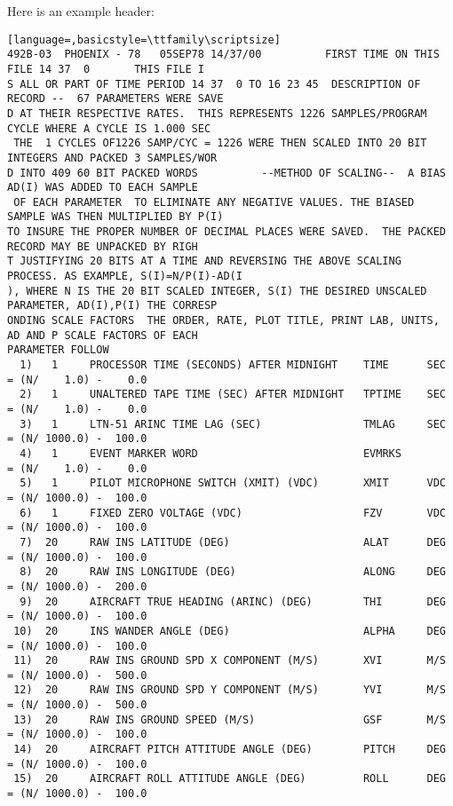 \documentclass{report}
\begin{document}
\noindent Here is an example header:
\begin{lstlisting}[language=,basicstyle=\ttfamily\scriptsize]
492B-03  PHOENIX - 78   05SEP78 14/37/00          FIRST TIME ON THIS FILE 14 37  0       THIS FILE I
S ALL OR PART OF TIME PERIOD 14 37  0 TO 16 23 45  DESCRIPTION OF RECORD --  67 PARAMETERS WERE SAVE
D AT THEIR RESPECTIVE RATES.  THIS REPRESENTS 1226 SAMPLES/PROGRAM CYCLE WHERE A CYCLE IS 1.000 SEC
 THE  1 CYCLES OF1226 SAMP/CYC = 1226 WERE THEN SCALED INTO 20 BIT INTEGERS AND PACKED 3 SAMPLES/WOR
D INTO 409 60 BIT PACKED WORDS          --METHOD OF SCALING--  A BIAS AD(I) WAS ADDED TO EACH SAMPLE
 OF EACH PARAMETER  TO ELIMINATE ANY NEGATIVE VALUES. THE BIASED SAMPLE WAS THEN MULTIPLIED BY P(I)
TO INSURE THE PROPER NUMBER OF DECIMAL PLACES WERE SAVED.  THE PACKED RECORD MAY BE UNPACKED BY RIGH
T JUSTIFYING 20 BITS AT A TIME AND REVERSING THE ABOVE SCALING PROCESS. AS EXAMPLE, S(I)=N/P(I)-AD(I
), WHERE N IS THE 20 BIT SCALED INTEGER, S(I) THE DESIRED UNSCALED PARAMETER, AD(I),P(I) THE CORRESP
ONDING SCALE FACTORS  THE ORDER, RATE, PLOT TITLE, PRINT LAB, UNITS, AD AND P SCALE FACTORS OF EACH
PARAMETER FOLLOW
  1)   1     PROCESSOR TIME (SECONDS) AFTER MIDNIGHT    TIME      SEC     = (N/    1.0) -    0.0
  2)   1     UNALTERED TAPE TIME (SEC) AFTER MIDNIGHT   TPTIME    SEC     = (N/    1.0) -    0.0
  3)   1     LTN-51 ARINC TIME LAG (SEC)                TMLAG     SEC     = (N/ 1000.0) -  100.0
  4)   1     EVENT MARKER WORD                          EVMRKS            = (N/    1.0) -    0.0
  5)   1     PILOT MICROPHONE SWITCH (XMIT) (VDC)       XMIT      VDC     = (N/ 1000.0) -  100.0
  6)   1     FIXED ZERO VOLTAGE (VDC)                   FZV       VDC     = (N/ 1000.0) -  100.0
  7)  20     RAW INS LATITUDE (DEG)                     ALAT      DEG     = (N/ 1000.0) -  100.0
  8)  20     RAW INS LONGITUDE (DEG)                    ALONG     DEG     = (N/ 1000.0) -  200.0
  9)  20     AIRCRAFT TRUE HEADING (ARINC) (DEG)        THI       DEG     = (N/ 1000.0) -  100.0
 10)  20     INS WANDER ANGLE (DEG)                     ALPHA     DEG     = (N/ 1000.0) -  100.0
 11)  20     RAW INS GROUND SPD X COMPONENT (M/S)       XVI       M/S     = (N/ 1000.0) -  500.0
 12)  20     RAW INS GROUND SPD Y COMPONENT (M/S)       YVI       M/S     = (N/ 1000.0) -  500.0
 13)  20     RAW INS GROUND SPEED (M/S)                 GSF       M/S     = (N/ 1000.0) -  100.0
 14)  20     AIRCRAFT PITCH ATTITUDE ANGLE (DEG)        PITCH     DEG     = (N/ 1000.0) -  100.0
 15)  20     AIRCRAFT ROLL ATTITUDE ANGLE (DEG)         ROLL      DEG     = (N/ 1000.0) -  100.0

\end{lstlisting}
\end{document}
